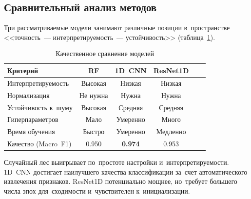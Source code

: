 \subsection{Сравнительный анализ методов}

Три рассматриваемые модели занимают различные позиции
в~пространстве <<точность~--- интерпретируемость~--- устойчивость>>
(таблица~\ref{tab:model_comparison}).

\begin{table}[h]
\centering
\caption{Качественное сравнение моделей}
\label{tab:model_comparison}
\begin{tabular}{lccccc}
\hline
\textbf{Критерий} & \textbf{RF} & \textbf{1D~CNN} & \textbf{ResNet1D} \\
\hline
Интерпретируемость     & Высокая  & Низкая   & Низкая  \\
Нормализация           & Не нужна & Нужна    & Нужна   \\
Устойчивость к~шуму    & Высокая  & Средняя  & Средняя \\
Гиперпараметров        & Мало     & Умеренно & Много   \\
Время обучения         & Быстро   & Умеренно & Медленно \\
Качество (Macro~F1)    & 0.950    & \textbf{0.974}    & 0.953   \\
\hline
\end{tabular}
\end{table}

Случайный лес выигрывает по~простоте настройки и~интерпретируемости.
1D~CNN достигает наилучшего качества классификации за~счет
автоматического извлечения признаков.
ResNet1D потенциально мощнее, но~требует большего числа эпох
для~сходимости и~чувствителен к~инициализации.
